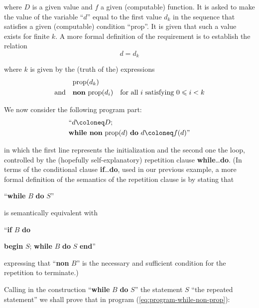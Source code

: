 \documentclass[twoside,11pt]{book}
\begin{document}
\noindent
where $D$ is a given value and $f$ a given (computable) function. It is asked to make the value of the variable ``$d$'' equal to the first value $d_k$ in the sequence that satisfies a given (computable) condition ``prop''. It is given that such a value exists for finite $k$. A more formal definition of the requirement is to establish the relation
\begin{equation}
	\label{eq:induction-dk}
	d=d_k
\end{equation}

\noindent
where $k$ is given by the (truth of the) expressions
\begin{align}
	\label{eq:prod-dk}
	&\text{prop}(d_k)& \\
	\label{eq:non-prop-i}
	\text{and}\quad &\text{\textbf{non} prop}(d_i)& \text{for all } i \text{ satisfying } 0 \leqslant i < k
\end{align}

We now consider the following program part:
\begin{equation}
	\label{eq:program-while-non-prop}
	\begin{split}
		&\text{``}d \coloneq D;\\
		&\text{\textbf{while non} prop}(d) \text{ \textbf{do} } d \coloneq f(d)\text{''}
	\end{split}
\end{equation}

\noindent
in which the first line represents the initialization and the second one the loop, controlled by the (hopefully self-explanatory) repetition clause \textbf{while}\dots\textbf{do}. (In terms of the conditional clause \textbf{if}\dots\textbf{do}, used in our previous example, a more formal definition of the semantics of the repetition clause is by stating
that
\medskip

{
	\setlength{\parindent}{8em}
	\hspace{-.4em}``\textbf{while} $B$ \textbf{do} $S$''
}
\medskip

\noindent
is semantically equivalent with
\medskip

{
	\setlength{\parindent}{8em}
	\hspace{-.4em}``\textbf{if} $B$ \textbf{do}
	
	\quad \textbf{begin} $S$; \textbf{while} $B$ \textbf{do} $S$ \textbf{end}''
}
\medskip

\noindent
expressing that ``\textbf{non} $B$'' is the necessary and sufficient condition for the repetition to terminate.)

Calling in the construction ``\textbf{while} $B$ \textbf{do} $S$'' the statement $S$ ``the repeated statement'' we shall prove that in program (\ref{eq:program-while-non-prop}):
\end{document}
